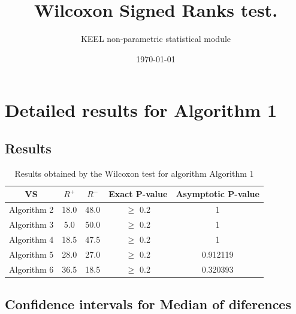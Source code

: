 \documentclass[a4paper,10pt]{article}
\title{Wilcoxon Signed Ranks test.}
\date{\today}
\author{KEEL non-parametric statistical module}
\begin{document}
\pagestyle{empty}
\maketitle
\thispagestyle{empty}



\section{Detailed results for Algorithm 1}


\subsection{Results}

\begin{table}[!htp]
\centering\small
\begin{tabular}{
|c|c|c|c|c|}
\hline
 VS & $R^{+}$ & $R^{-}$ & Exact P-value & Asymptotic P-value \\ \hline 
Algorithm 2 & 18.0 & 48.0 & $\geq$ 0.2 & 1\\ \hline 
Algorithm 3 & 5.0 & 50.0 & $\geq$ 0.2 & 1\\ \hline 
Algorithm 4 & 18.5 & 47.5 & $\geq$ 0.2 & 1\\ \hline 
Algorithm 5 & 28.0 & 27.0 & $\geq$ 0.2 & 0.912119\\ \hline 
Algorithm 6 & 36.5 & 18.5 & $\geq$ 0.2 & 0.320393\\ \hline 

\end{tabular}
\caption{Results obtained by the Wilcoxon test for algorithm Algorithm 1}
\end{table}

\subsection{Confidence intervals for Median of diferences}
\end{document}
